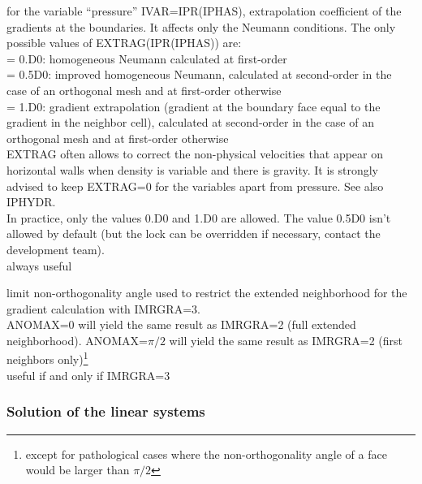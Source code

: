 {for the variable ``pressure'' IVAR=IPR(IPHAS), extrapolation coefficient
of the gradients at the boundaries. It affects only the Neumann conditions.
The only possible values of EXTRAG(IPR(IPHAS)) are:\\
\hspace*{1.3cm}= 0.D0: homogeneous Neumann calculated at first-order\\
\hspace*{1.3cm}= 0.5D0: improved homogeneous Neumann, calculated at
second-order in the case of an orthogonal mesh and at first-order otherwise\\
\hspace*{1.3cm}= 1.D0: gradient extrapolation (gradient at the boundary face
equal to the gradient in the neighbor cell), calculated at
second-order in the case of an orthogonal mesh and at first-order otherwise\\
EXTRAG often allows to correct the non-physical velocities that
appear on horizontal walls when density is variable and there is gravity.
It is strongly advised to keep EXTRAG=0 for the variables apart from
pressure. See also IPHYDR.\\  
In practice, only the values 0.D0 and 1.D0 are allowed. The 
value 0.5D0 isn't allowed by default (but the lock can be overridden if
necessary, contact the development team).\\
always useful}

{limit non-orthogonality angle used to restrict the extended neighborhood for
the gradient calculation with IMRGRA=3.\\
ANOMAX=0 will yield the same result as IMRGRA=2 (full extended
neighborhood). ANOMAX=$\pi/2$ will yield the same result as IMRGRA=2 (first
neighbors only)\footnote{except for pathological cases where the
non-orthogonality angle of a face would be larger than $\pi/2$}\\
useful if and only if IMRGRA=3}

\subsubsection{Solution of the linear systems}

